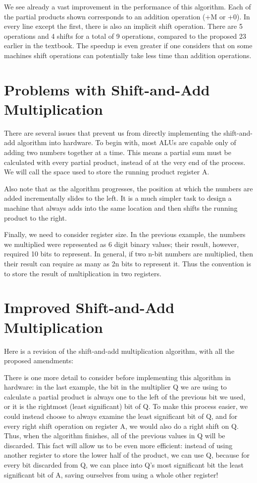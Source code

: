 \documentclass{article}
\begin{document}
We see already a vast improvement in the performance of this algorithm.
Each of the partial products shown corresponds to an addition operation (+M or +0).
In every line except the first, there is also an implicit shift operation.
There are 5 operations and 4 shifts for a total of 9 operations, compared to the proposed 23 earlier in the textbook.
The speedup is even greater if one considers that on some machines shift operations can potentially take less time than addition operations.

\section{Problems with Shift-and-Add Multiplication}
There are several issues that prevent us from directly implementing the shift-and-add algorithm into hardware.
To begin with, most ALUs are capable only of adding two numbers together at a time.
This means a partial sum must be calculated with every partial product, instead of at the very end of the process.
We will call the space used to store the running product register A.

Also note that as the algorithm progresses, the position at which the numbers are added incrementally slides to the left.
It is a much simpler task to design a machine that always adds into the same location and then shifts the running product to the right.

Finally, we need to consider register size.
In the previous example, the numbers we multiplied were represented as 6 digit binary values; their result, however, required 10 bits to represent.
In general, if two n-bit numbers are multiplied, then their result can require as many as 2n bits to represent it.
Thus the convention is to store the result of multiplication in two registers.

\section{Improved Shift-and-Add Multiplication}
Here is a revision of the shift-and-add multiplication algorithm, with all the proposed amendments: %

There is one more detail to consider before implementing this algorithm in hardware: in the last example, the bit in the multiplier Q we are using to calculate a partial product is always one to the left of the previous bit we used, or it is the rightmost (least significant) bit of Q.
To make this process easier, we could instead choose to always examine the least significant bit of Q, and for every right shift operation on register A, we would also do a right shift on Q.
Thus, when the algorithm finishes, all of the previous values in Q will be discarded.
This fact will allow us to be even more efficient: instead of using another register to store the lower half of the product, we can use Q, because for every bit discarded from Q, we can place into Q's most significant bit the least significant bit of A, saving ourselves from using a whole other register!
\end{document}
